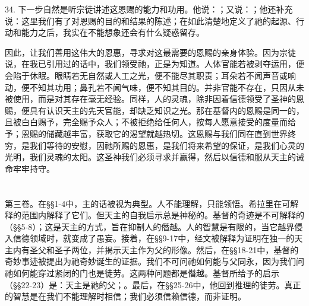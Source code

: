 34. 下一步自然是听宗徒讲述这恩赐的能力和功用。他说：；又说：；他还补充说：这里我们有了对恩赐的目的和结果的陈述；在如此清楚地定义了祂的起源、行动和能力之后，我实在不能想象还会有什么疑惑留存。\par

因此，让我们善用这伟大的恩惠，寻求对这最需要的恩赐的亲身体验。因为宗徒说，在我已引用过的话中，我们领受祂，正是为知道。人体官能若被剥夺运用，便会陷于休眠。眼睛若无自然或人工之光，便不能尽其职责；耳朵若不闻声音或响动，便不知其功用；鼻孔若不闻气味，便不知其目的。并非官能不存在，只因从未被使用，而是对其存在毫无经验。同样，人的灵魂，除非因着信德领受了圣神的恩赐，便具有认识天主的先天官能，却缺乏知识之光。那在基督内的恩赐是同一的，且被白白赐予，完全赐予众人；不被拒绝给任何人，按每人愿意接受的度量而给予；恩赐的储藏越丰富，获取它的渴望就越热切。这恩赐与我们同在直到世界终穷，是我们等待的安慰，因祂所赐的恩惠，是我们将来希望的保证，是我们心灵的光明，我们灵魂的太阳。这圣神我们必须寻求并赢得，然后以信德和服从天主的诫命牢牢持守。\par



\section{}

第三卷。在§§1-4中，主的话被视为典型。人不能理解，只能领悟。希拉里在可解释的范围内解释了它们。但天主的自我启示总是神秘的。基督的奇迹是不可解释的（§§5-8）；这是天主的方式，旨在抑制人的僭越。人的智慧是有限的，当它越界侵入信德领域时，就变成了愚妄。接着，在§§9-17中，经文被解释为证明在独一的天主内有圣父和圣子两位，并揭示天主作为父的形像。然后，在§§18-21中，基督的奇妙事迹被提出为祂奇妙诞生的证据。我们不可问祂如何能与父同永，因为我们问祂如何能穿过紧闭的门也是徒劳。这两种问题都是僭越。基督所给予的启示（§§22-23）是：天主是祂的父；。最后，在§§25-26中，他回到推理的徒劳。真正的智慧是在我们不能理解时相信；我们必须信赖信德，而非证明。\par


